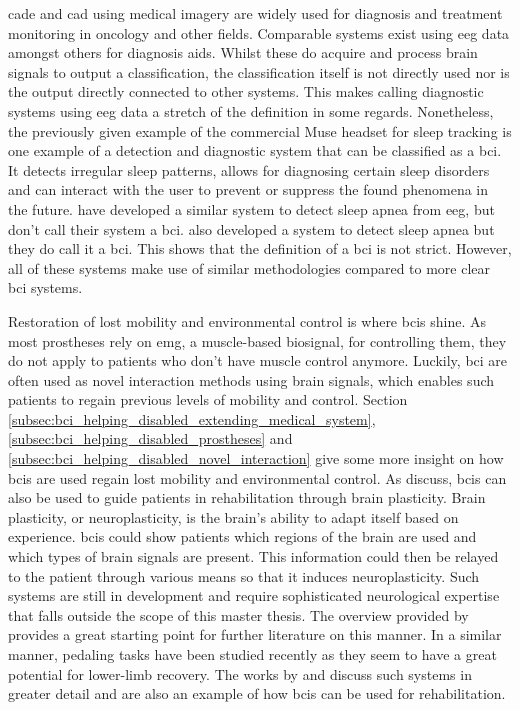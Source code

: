 \Gls{cade} and \gls{cad} using medical imagery are widely used for diagnosis and treatment monitoring in oncology and other fields.
Comparable systems exist using \gls{eeg} data amongst others for diagnosis aids.
Whilst these do acquire and process brain signals to output a classification, the classification itself is not directly used nor is the output directly connected to other systems.
This makes calling diagnostic systems using \gls{eeg} data a stretch of the definition in some regards.
Nonetheless, the previously given example of the commercial Muse headset for sleep tracking is one example of a detection and diagnostic system that can be classified as a \gls{bci}.
It detects irregular sleep patterns, allows for diagnosing certain sleep disorders and can interact with the user to prevent or suppress the found phenomena in the future.
 have developed a similar system to detect sleep apnea from \gls{eeg}, but don't call their system a \gls{bci}.
 also developed a system to detect sleep apnea but they do call it a \gls{bci}.
This shows that the definition of a \gls{bci} is not strict.
However, all of these systems make use of similar methodologies compared to more clear \gls{bci} systems.



Restoration of lost mobility and environmental control is where \glspl{bci} shine.
As most prostheses rely on \gls{emg}, a muscle-based \gls{biosignal}, for controlling them, they do not apply to patients who don't have muscle control anymore.
Luckily, \gls{bci} are often used as novel interaction methods using brain signals, which enables such patients to regain previous levels of mobility and control.
Section \ref{subsec:bci_helping_disabled_extending_medical_system}, \ref{subsec:bci_helping_disabled_prostheses} and \ref{subsec:bci_helping_disabled_novel_interaction} give some more insight on how \glspl{bci} are used regain lost mobility and environmental control.
As \citet{bci_rehabilitation} discuss, \glspl{bci} can also be used to guide patients in rehabilitation through brain plasticity.
Brain plasticity, or neuroplasticity, is the brain's ability to adapt itself based on experience.
\Glspl{bci} could show patients which regions of the brain are used and which types of brain signals are present.
This information could then be relayed to the patient through various means so that it induces neuroplasticity.
Such systems are still in development and require sophisticated neurological expertise that falls outside the scope of this master thesis.
The overview provided by \citet{bci_rehabilitation} provides a great starting point for further literature on this manner.
In a similar manner, pedaling  tasks have been studied recently as they seem to have a great potential for lower-limb recovery.
The works by \citet{pedal_mi_rehabilitation1} and \citet{pedal_mi_rehabilitation2} discuss such systems in greater detail and are also an example of how \glspl{bci} can be used for rehabilitation.

